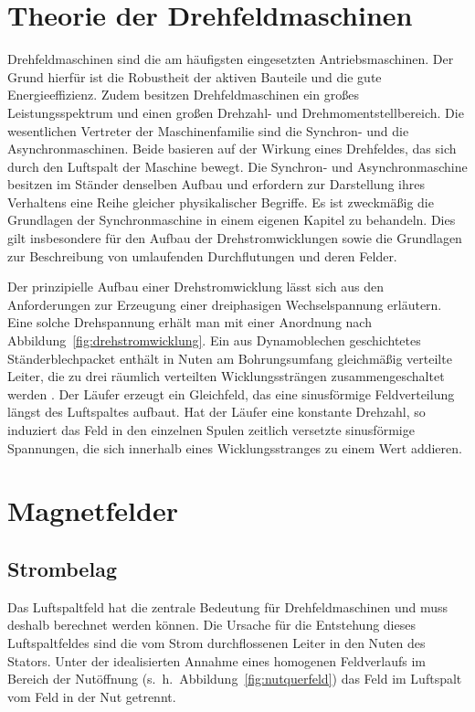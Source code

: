 \section{Theorie der Drehfeldmaschinen}\label{sec:grund-drehfeld}

Drehfeldmaschinen sind die am häufigsten eingesetzten Antriebsmaschinen. Der Grund hierfür ist die Robustheit der aktiven Bauteile und die gute Energieeffizienz.
Zudem besitzen Drehfeldmaschinen ein großes Leistungsspektrum und einen großen Drehzahl- und Drehmomentstellbereich.
Die wesentlichen Vertreter der Maschinenfamilie sind die Synchron- und die Asynchronmaschinen.
Beide basieren auf der Wirkung eines Drehfeldes, das sich durch den Luftspalt der Maschine bewegt.
Die Synchron- und Asynchronmaschine besitzen im Ständer denselben Aufbau und erfordern zur Darstellung ihres Verhaltens eine Reihe gleicher physikalischer Begriffe.
Es ist zweckmäßig die Grundlagen der Synchronmaschine in einem eigenen Kapitel zu behandeln.
Dies gilt insbesondere für den Aufbau der Drehstromwicklungen sowie die Grundlagen zur Beschreibung von umlaufenden Durchflutungen und deren Felder.

Der prinzipielle Aufbau einer Drehstromwicklung lässt sich aus den Anforderungen zur Erzeugung einer dreiphasigen Wechselspannung erläutern.
Eine solche Drehspannung erhält man mit einer Anordnung nach Abbildung~\ref{fig:drehstromwicklung}.
Ein aus Dynamoblechen geschichtetes Ständerblechpacket enthält in Nuten am Bohrungsumfang gleichmäßig verteilte Leiter, die zu drei räumlich verteilten Wicklungssträngen zusammengeschaltet werden \autocite[S.~141]{fischer2009}.
Der Läufer erzeugt ein Gleichfeld, das eine sinusförmige Feldverteilung längst des Luftspaltes aufbaut.
Hat der Läufer eine konstante Drehzahl, so induziert das Feld in den einzelnen Spulen zeitlich versetzte sinusförmige Spannungen, die sich innerhalb eines Wicklungsstranges zu einem Wert addieren.

\section{Magnetfelder}

\subsection{Strombelag}

Das Luftspaltfeld hat die zentrale Bedeutung für Drehfeldmaschinen und muss deshalb berechnet werden können.
Die Ursache für die Entstehung dieses Luftspaltfeldes sind die vom Strom durchflossenen Leiter in den Nuten des Stators.
Unter der idealisierten Annahme eines homogenen Feldverlaufs im Bereich der Nutöffnung (s.~h.~Abbildung~\ref{fig:nutquerfeld}) das Feld im Luftspalt vom Feld in der Nut getrennt.

